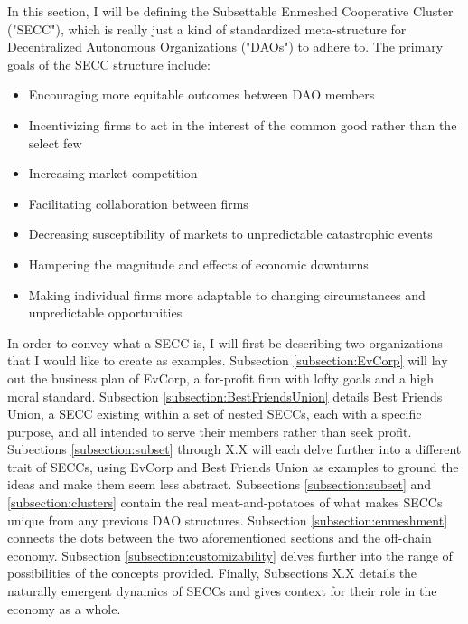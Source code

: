 \documentclass{article}[10pt]
\begin{document}
In this section, I will be defining the Subsettable Enmeshed Cooperative Cluster ("SECC"), which is really just a kind of standardized meta-structure for Decentralized Autonomous Organizations ("DAOs") to adhere to. 
The primary goals of the SECC structure include: 
\begin{itemize}
    \item Encouraging more equitable outcomes between DAO members
    \item Incentivizing firms to act in the interest of the common good rather than the select few
    \item Increasing market competition
    \item Facilitating collaboration between firms
    \item Decreasing susceptibility of markets to unpredictable catastrophic events %
    \item Hampering the magnitude and effects of economic downturns
    \item Making individual firms more adaptable to changing circumstances and unpredictable opportunities
\end{itemize} \par 
In order to convey what a SECC is, I will first be describing two organizations that I would like to create as examples. 
Subsection \ref{subsection:EvCorp} will lay out the business plan of EvCorp, a for-profit firm with lofty goals and a high moral standard. 
Subsection \ref{subsection:BestFriendsUnion} details Best Friends Union, a SECC existing within a set of nested SECCs, each with a specific purpose, and all intended to serve their members rather than seek profit. 
Subections \ref{subsection:subset} through X.X will each delve further into a different trait of SECCs, using EvCorp and Best Friends Union as examples to ground the ideas and make them seem less abstract.
Subsections \ref{subsection:subset} and \ref{subsection:clusters} contain the real meat-and-potatoes of what makes SECCs unique from any previous DAO structures.
Subsection \ref{subsection:enmeshment} connects the dots between the two aforementioned sections and the off-chain economy.
Subsection \ref{subsection:customizability} delves further into the range of possibilities of the concepts provided.
Finally, Subsections X.X details the naturally emergent dynamics of SECCs and gives context for their role in the economy as a whole.
\end{document}
